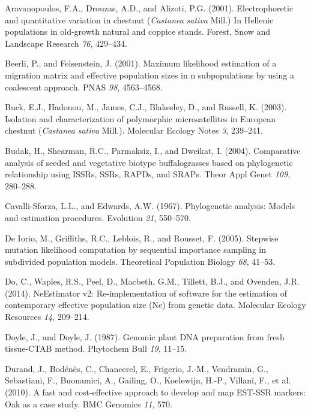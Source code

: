 \documentclass[12pt,a4paper,]{report}
\begin{document}
\leavevmode\hypertarget{ref-Aravanopoulos2001}{}%
Aravanopoulos, F.A., Drouzas, A.D., and Alizoti, P.G. (2001).
Electrophoretic and quantitative variation in chestnut (\emph{Castanea}
\emph{sativa} Mill.) In Hellenic populations in old-growth natural and
coppice stands. Forest, Snow and Landscape Research \emph{76}, 429--434.

\leavevmode\hypertarget{ref-beerli_maximum_2001}{}%
Beerli, P., and Felsenstein, J. (2001). Maximum likelihood estimation of
a migration matrix and effective population sizes in n subpopulations by
using a coalescent approach. PNAS \emph{98}, 4563--4568.

\leavevmode\hypertarget{ref-buck_isolation_2003}{}%
Buck, E.J., Hadonou, M., James, C.J., Blakesley, D., and Russell, K.
(2003). Isolation and characterization of polymorphic microsatellites in
European chestnut (\emph{Castanea} \emph{sativa} Mill.). Molecular
Ecology Notes \emph{3}, 239--241.

\leavevmode\hypertarget{ref-budak_comparative_2004}{}%
Budak, H., Shearman, R.C., Parmaksiz, I., and Dweikat, I. (2004).
Comparative analysis of seeded and vegetative biotype buffalograsses
based on phylogenetic relationship using ISSRs, SSRs, RAPDs, and SRAPs.
Theor Appl Genet \emph{109}, 280--288.

\leavevmode\hypertarget{ref-cavalli1967phylogenetic}{}%
Cavalli-Sforza, L.L., and Edwards, A.W. (1967). Phylogenetic analysis:
Models and estimation procedures. Evolution \emph{21}, 550--570.

\leavevmode\hypertarget{ref-de_iorio_stepwise_2005}{}%
De Iorio, M., Griffiths, R.C., Leblois, R., and Rousset, F. (2005).
Stepwise mutation likelihood computation by sequential importance
sampling in subdivided population models. Theoretical Population Biology
\emph{68}, 41--53.

\leavevmode\hypertarget{ref-Do2014}{}%
Do, C., Waples, R.S., Peel, D., Macbeth, G.M., Tillett, B.J., and
Ovenden, J.R. (2014). NeEstimator v2: Re-implementation of software for
the estimation of contemporary effective population size (Ne) from
genetic data. Molecular Ecology Resources \emph{14}, 209--214.

\leavevmode\hypertarget{ref-doyle1987genomic}{}%
Doyle, J., and Doyle, J. (1987). Genomic plant DNA preparation from
fresh tissue-CTAB method. Phytochem Bull \emph{19}, 11--15.

\leavevmode\hypertarget{ref-durand_fast_2010}{}%
Durand, J., Bodénès, C., Chancerel, E., Frigerio, J.-M., Vendramin, G.,
Sebastiani, F., Buonamici, A., Gailing, O., Koelewijn, H.-P., Villani,
F., et al. (2010). A fast and cost-effective approach to develop and map
EST-SSR markers: Oak as a case study. BMC Genomics \emph{11}, 570.
\end{document}
